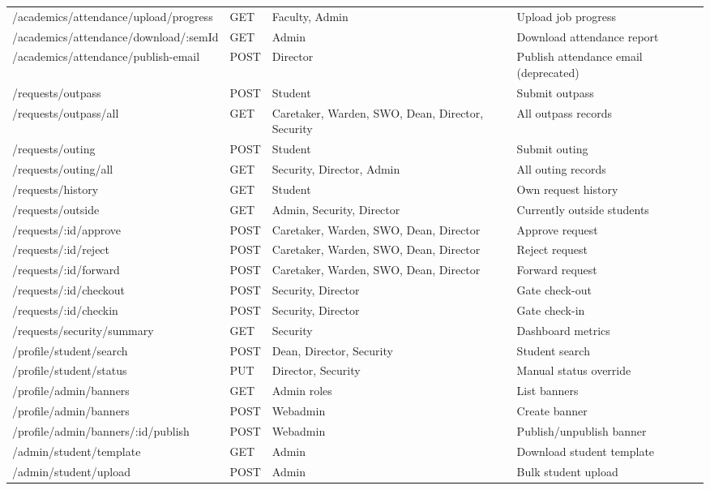 \documentclass[12pt,a4paper]{report}
\begin{document}
\begin{longtable}{p{4.3cm}p{1.6cm}p{3.2cm}p{3.5cm}}
/academics/attendance/upload/progress & GET & Faculty, Admin & Upload job progress \\
/academics/attendance/download/:semId & GET & Admin & Download attendance report \\
/academics/attendance/publish-email & POST & Director & Publish attendance email (deprecated) \\
/requests/outpass & POST & Student & Submit outpass \\
/requests/outpass/all & GET & Caretaker, Warden, SWO, Dean, Director, Security & All outpass records \\
/requests/outing & POST & Student & Submit outing \\
/requests/outing/all & GET & Security, Director, Admin & All outing records \\
/requests/history & GET & Student & Own request history \\
/requests/outside & GET & Admin, Security, Director & Currently outside students \\
/requests/:id/approve & POST & Caretaker, Warden, SWO, Dean, Director & Approve request \\
/requests/:id/reject & POST & Caretaker, Warden, SWO, Dean, Director & Reject request \\
/requests/:id/forward & POST & Caretaker, Warden, SWO, Dean, Director & Forward request \\
/requests/:id/checkout & POST & Security, Director & Gate check-out \\
/requests/:id/checkin & POST & Security, Director & Gate check-in \\
/requests/security/summary & GET & Security & Dashboard metrics \\
/profile/student/search & POST & Dean, Director, Security & Student search \\
/profile/student/status & PUT & Director, Security & Manual status override \\
/profile/admin/banners & GET & Admin roles & List banners \\
/profile/admin/banners & POST & Webadmin & Create banner \\
/profile/admin/banners/:id/publish & POST & Webadmin & Publish/unpublish banner \\
/admin/student/template & GET & Admin & Download student template \\
/admin/student/upload & POST & Admin & Bulk student upload \\
\end{longtable}
\end{document}

